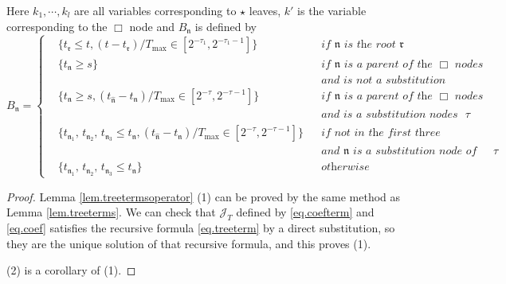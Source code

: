\begin{lem}
\begin{equation}
\end{equation}
Here $k_1,\cdots,k_{l}$ are all variables corresponding to $\star$ leaves, $k'$ is the variable corresponding to the $\Box$ node and $B_{\mathfrak{n}}$ is defined by 
\begin{equation}
    B_{\mathfrak{n}}=\left\{
    \begin{aligned}
        &\{t_{\mathfrak{r}}\le t, (t-t_{\mathfrak{r}})/T_{\text{max}}\in [2^{-\tau_{1}},2^{-\tau_{1}-1}]\} && \textit{if $\mathfrak{n}$ is the root $\mathfrak{r}$ }
        \\
        &\{t_{\mathfrak{n}}\ge s\} && \textit{if $\mathfrak{n}$ is a parent of the $\Box$ nodes}
        \\
        &\  &&\textit{and is not a substitution nodes}
        \\
        &\{t_{\mathfrak{n}}\ge s, (t_{\widehat{\mathfrak{n}}}-t_{\mathfrak{n}})/T_{\text{max}}\in [2^{-\tau},2^{-\tau-1}]\} && \textit{if $\mathfrak{n}$ is a parent of the $\Box$ nodes}
        \\
        &\  &&\textit{and is a substitution nodes of index $\tau$}
        \\
        &\{t_{\mathfrak{n}_1},\, t_{\mathfrak{n}_2},\, t_{\mathfrak{n}_3}\le t_{\mathfrak{n}}, (t_{\widehat{\mathfrak{n}}}-t_{\mathfrak{n}})/T_{\text{max}}\in [2^{-\tau},2^{-\tau-1}]\}  &&\textit{if not in the first three cases}
        \\
        &\  &&\textit{and $\mathfrak{n}$ is a substitution node of index $\tau$}
        \\
        &\{t_{\mathfrak{n}_1},\, t_{\mathfrak{n}_2},\, t_{\mathfrak{n}_3}\le t_{\mathfrak{n}}\} && \textit{otherwise}
    \end{aligned}\right.
\end{equation}
\end{lem}
\begin{proof}
Lemma \ref{lem.treetermsoperator} (1) can be proved by the same method as Lemma \ref{lem.treeterms}. We can check that $\mathcal{J}_T$ defined by \eqref{eq.coefterm} and \eqref{eq.coef} satisfies the recursive formula \eqref{eq.treeterm} by a direct substitution, so they are the unique solution of that recursive formula, and this proves (1).

(2) is a corollary of (1).
\end{proof}

